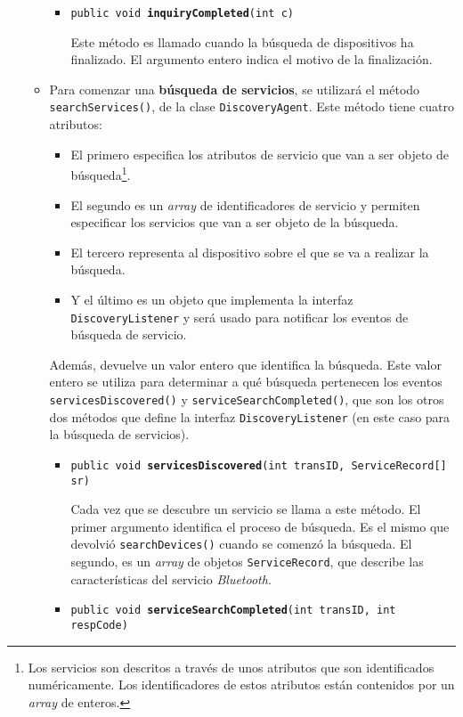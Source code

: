 \begin{itemize}
\begin{itemize}
\begin{itemize}
    \item \texttt{public void \textbf{inquiryCompleted}(int c)}

    Este método es llamado cuando la búsqueda de dispositivos ha finalizado. El
    argumento entero indica el motivo de la finalización.
    \end{itemize}

  \item Para comenzar una \textbf{búsqueda de servicios}, se utilizará el
  método \texttt{searchServices()}, de la clase \texttt{DiscoveryAgent}. Este
  método tiene cuatro atributos:
    \begin{itemize}
    \item El primero especifica los atributos de servicio que van a ser objeto
    de búsqueda\footnote{Los servicios son descritos a través de unos atributos 
    que son identificados numéricamente. Los identificadores de estos atributos 
    están contenidos por un \emph{array} de enteros.}.
    \item El segundo es un \emph{array} de identificadores de servicio y
    permiten especificar los servicios que van a ser objeto de la búsqueda.
    \item El tercero representa al dispositivo sobre el que se va a realizar la
    búsqueda.
    \item Y el último es un objeto que implementa la interfaz
    \texttt{DiscoveryListener} y será usado para notificar los eventos de 
    búsqueda de servicio.
    \end{itemize}
  Además, devuelve un valor entero que identifica la búsqueda. Este valor
  entero se utiliza para determinar a qué búsqueda pertenecen los eventos
  \texttt{servicesDiscovered()} y \texttt{serviceSearchCompleted()}, que son
  los otros dos métodos que define la interfaz \texttt{DiscoveryListener} (en
  este caso para la búsqueda de servicios).
    \begin{itemize}
    \item \texttt{public void \textbf{servicesDiscovered}(int transID,
      ServiceRecord[] sr)}

    Cada vez que se descubre un servicio se llama a este método. El primer
    argumento identifica el proceso de búsqueda. Es el mismo que devolvió
    \texttt{searchDevices()} cuando se comenzó la búsqueda. El segundo, es un
    \emph{array} de objetos \texttt{ServiceRecord}, que describe las
    características del servicio \emph{Bluetooth}.

    \item \texttt{public void \textbf{serviceSearchCompleted}(int transID, int 
    respCode)}


\end{itemize}
\end{itemize}
\end{itemize}

